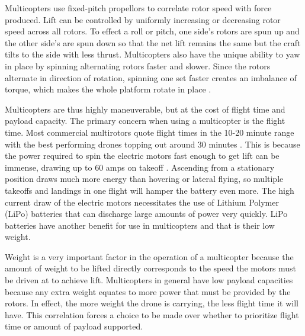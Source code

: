 Multicopters use fixed-pitch propellors to correlate rotor speed with force produced. Lift can be controlled by uniformly increasing or decreasing rotor speed across all rotors. To effect a roll or pitch, one side's rotors are spun up and the other side's are spun down so that the net lift remains the same but the craft tilts to the side with less thrust. Multicopters also have the unique ability to yaw in place by spinning alternating rotors faster and slower. Since the rotors alternate in direction of rotation, spinning one set faster creates an imbalance of torque, which makes the whole platform rotate in place \cite{multicopter_dynamics_2}.\par
Multicopters are thus highly maneuverable, but at the cost of flight time and payload capacity. The primary concern when using a multicopter is the flight time. Most commercial multirotors quote flight times in the 10-20 minute range with the best performing drones topping out around 30 minutes \cite{multicopter_comparison}. This is because the power required to spin the electric motors fast enough to get lift can be immense, drawing up to 60 amps on takeoff \cite{multicopter_long_range_mqp}. Ascending from a stationary position draws much more energy than hovering or lateral flying, so multiple takeoffs and landings in one flight will hamper the battery even more. The high current draw of the electric motors necessitates the use of Lithium Polymer (LiPo) batteries that can discharge large amounts of power very quickly. LiPo batteries have another benefit for use in multicopters and that is their low weight.\par
Weight is a very important factor in the operation of a multicopter because the amount of weight to be lifted directly corresponds to the speed the motors must be driven at to achieve lift. Multicopters in general have low payload capacities because any extra weight equates to more power that must be provided by the rotors. In effect, the more weight the drone is carrying, the less flight time it will have. This correlation forces a choice to be made over whether to prioritize flight time or amount of payload supported.\par
